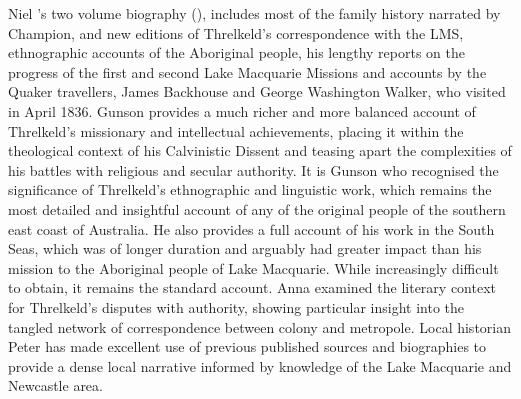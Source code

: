 Niel \citeauthor{gunson_australian_1974a}’s two volume biography (\citeyear{gunson_australian_1974a,gunson_australian_1974b}), includes most of the family history narrated by Champion, and new editions of Threlkeld’s correspondence with the LMS, ethnographic accounts of the Aboriginal people, his lengthy reports on the progress of the first and second Lake Macquarie Missions and accounts by the Quaker travellers, James Backhouse and George Washington Walker, who visited in April 1836. Gunson provides a much richer and more balanced account of Threlkeld’s missionary and intellectual achievements, placing it within the theological context of his Calvinistic Dissent and teasing apart the complexities of his battles with religious and secular authority. It is Gunson who recognised the significance of Threlkeld’s ethnographic and linguistic work, which remains the most detailed and insightful account of any of the original people of the southern east coast of Australia. He also provides a full account of his work in the South Seas, which was of longer duration and arguably had greater impact than his mission to the Aboriginal people of Lake Macquarie. While increasingly difficult to obtain, it remains the standard account. Anna \citet{johnston_paper_2011} examined the literary context for Threlkeld’s disputes with authority, showing particular insight into the tangled network of correspondence between colony and metropole. Local historian Peter \citet{murray_mission_2018} has made excellent use of previous published sources and biographies to provide a dense local narrative informed by knowledge of the Lake Macquarie and Newcastle area.

